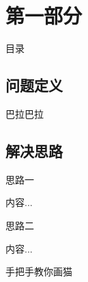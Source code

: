 \section{第一部分}
\begin{frame}[noframenumbering]{目录}
\end{frame}

\subsection{问题定义}
\begin{frame}{\insertsection}
\begin{defi}
	巴拉巴拉
\end{defi}
\end{frame}
\subsection{解决思路}
\begin{frame}{\insertsection}
	\begin{solu}
		思路一
	\end{solu}
	\vspace{1.4cm}
	内容...
\end{frame}

\begin{frame}{\insertsection}	
	\setcounter{solu}{1}
	\begin{solu}
		思路二
	\end{solu}
	\vspace{1.4cm}
	内容...
\end{frame}

\begin{frame}{手把手教你画猫}
\end{frame}